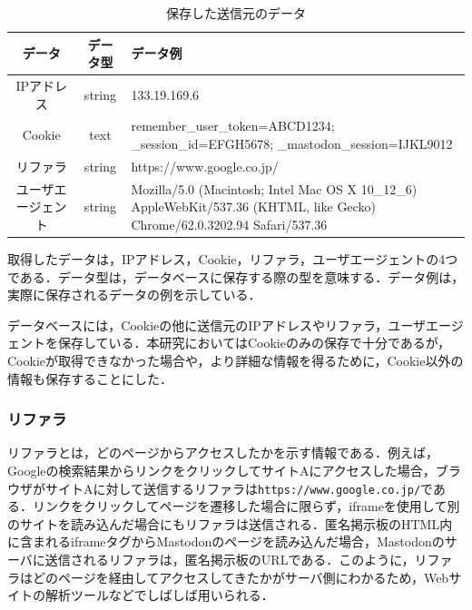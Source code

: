 \documentclass[10pt, a4paper]{jreport}
\begin{document}
\begin{table}[H]
	\caption{保存した送信元のデータ}
	\label{tb: buttons_database}
	\begin{center}
		\scalebox{0.8} {
			\begin{tabular}{ | c | c | p{8cm} | } \hline

データ & データ型 & データ例 \\ \hline
IPアドレス & string & 133.19.169.6 \\ \hline
Cookie & text & remember\_user\_token=ABCD1234; \_session\_id=EFGH5678; \_mastodon\_session=IJKL9012  \\ \hline
リファラ & string & https://www.google.co.jp/ \\ \hline
ユーザエージェント & string & Mozilla/5.0 (Macintosh; Intel Mac OS X 10\_12\_6) AppleWebKit/537.36 (KHTML, like Gecko) Chrome/62.0.3202.94 Safari/537.36 \\ \hline

			\end{tabular}
		}
	\end{center}
\end{table}

取得したデータは，IPアドレス，Cookie，リファラ，ユーザエージェントの4つである．データ型は，データベースに保存する際の型を意味する．データ例は，実際に保存されるデータの例を示している．

データベースには，Cookieの他に送信元のIPアドレスやリファラ，ユーザエージェントを保存している．本研究においてはCookieのみの保存で十分であるが，Cookieが取得できなかった場合や，より詳細な情報を得るために，Cookie以外の情報も保存することにした．

\subsubsection*{リファラ}
リファラとは，どのページからアクセスしたかを示す情報である．例えば，Googleの検索結果からリンクをクリックしてサイトAにアクセスした場合，ブラウザがサイトAに対して送信するリファラは\verb|https://www.google.co.jp/|である．リンクをクリックしてページを遷移した場合に限らず，iframeを使用して別のサイトを読み込んだ場合にもリファラは送信される．匿名掲示板のHTML内に含まれるiframeタグからMastodonのページを読み込んだ場合，Mastodonのサーバに送信されるリファラは，匿名掲示板のURLである．このように，リファラはどのページを経由してアクセスしてきたかがサーバ側にわかるため，Webサイトの解析ツールなどでしばしば用いられる．
\end{document}
